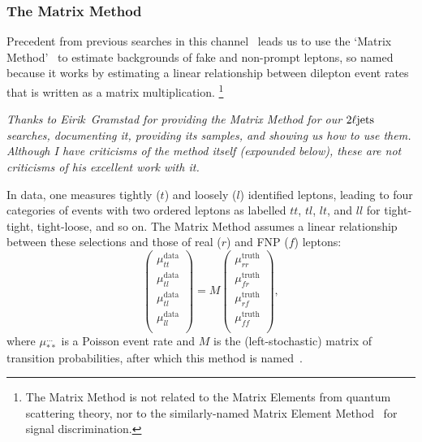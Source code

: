 \subsubsection{The Matrix Method}
\label{sec:2ljets_matrix_method}
Precedent from previous searches in this channel~\cite{
atlas_2l_SUSY_2013_11,
atlas_23l_SUSY_2016_24
}
leads us to use the `Matrix Method'~\cite{
ATLAS-CONF-2014-058,
D0:1999qdf
}
to estimate backgrounds of fake and non-prompt leptons, so named because it
works by estimating a linear relationship between dilepton event rates that is
written as a matrix multiplication.%
\footnote{%
The Matrix Method is not related to the Matrix Elements from quantum scattering
theory, nor to the similarly-named
Matrix Element Method~\cite{Gainer:2013iya} for signal discrimination.%
}

\emph{
Thanks to Eirik~Gramstad for providing the Matrix Method for our
$2\ell\mathrm{jets}$ searches, documenting it, providing its samples, and showing us how
to use them.
Although I have criticisms of the method itself (expounded below), these
are not criticisms of his excellent work with it.
}

In data, one measures tightly ($t$) and loosely ($l$) identified leptons, leading
to four categories of events with two ordered leptons as labelled $tt$, $tl$,
$lt$, and $ll$ for tight-tight, tight-loose, and so on.
The Matrix Method assumes a linear relationship between these selections
and those of real ($r$) and FNP ($f$) leptons:
\begin{equation}
\label{eqn:2ljets_matrix_method}
\begin{pmatrix}
\mu^\textrm{data}_{tt} \\
\mu^\textrm{data}_{tl} \\
\mu^\textrm{data}_{tl} \\
\mu^\textrm{data}_{ll} \\
\end{pmatrix}
=
M
\begin{pmatrix}
\mu^\textrm{truth}_{rr} \\
\mu^\textrm{truth}_{fr} \\
\mu^\textrm{truth}_{rf} \\
\mu^\textrm{truth}_{ff} \\
\end{pmatrix}
,
\end{equation}
where $\mu^{\ldots}_{**}$ is a Poisson event rate and $M$ is the
(left-stochastic) matrix of transition probabilities, after which this method
is named~\cite{ATLAS-CONF-2014-058}.

